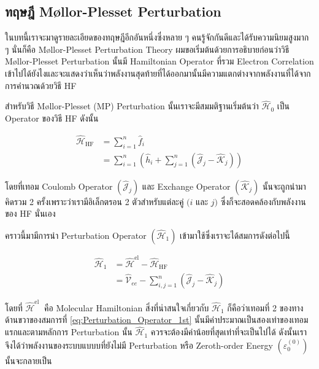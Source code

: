 \subsection{ทฤษฎี M\o{}llor-Plesset Perturbation}

ในบทนี้เราจะมาดูรายละเอียดของทฤษฎีอีกอันหนึ่งซึ่งหลาย ๆ คนรู้จักกันดีและได้รับความนิยมสูงมาก ๆ นั่นก็คือ M\o{}llor-Plesset Perturbation 
Theory ผมขอเริ่มต้นด้วยการอธิบายก่อนว่าวิธี M\o{}llor-Plesset Perturbation นั้นมี Hamiltonian Operator ที่รวม Electron 
Correlation เข้าไปได้ยังไงและจะแสดงว่าเห็นว่าพลังงานสุดท้ายที่ได้ออกมานั้นมีความแตกต่างจากพลังงานที่ได้จากการคำนวณด้วยวิธี HF 

สำหรับวิธี M\o{}llor-Plesset (MP) Perturbation นั้นเราจะมีสมมติฐานเริ่มต้นว่า $\hat{\mathscr{H}}_0$ เป็น Operator ของวิธี HF 
ดังนั้น

\begin{equation}
    \begin{aligned}
        \hat{\mathscr{H}}_{\mathrm{HF}} 
        & = \sum_{i=1}^n \hat{f}_i \\
        & = \sum_{i=1}^n 
            \left(\hat{h}_i+\sum_{j=1}^n\left(\hat{\mathscr{J}}_j-\hat{\mathscr{K}}_j\right)\right)
    \end{aligned}
\end{equation}

\noindent โดยที่เทอม Coulomb Operator $(\hat{\mathcal{J}}_j)$ และ Exchange Operator $(\hat{\mathcal{K}}_j)$  
นั้นจะถูกนำมาคิดรวม 2 ครั้งเพราะว่าเรามีอิเล็กตรอน 2 ตัวสำหรับแต่ละคู่ $(i$ และ $j)$ ซึ่งก็จะสอดคล้องกับพลังงานของ HF นั่นเอง 

คราวนี้มามีการนำ Perturbation Operator $(\hat{\mathscr{H}}_1)$ เข้ามาใช้ซึ่งเราจะได้สมการดังต่อไปนี้ 

\begin{equation}
    \label{eq:Perturbation_Operator_1st}
    \begin{aligned}
        \hat{\mathscr{H}}_1 
        & = \hat{\mathscr{H}}^{\mathrm{el}}-\hat{\mathscr{H}}_{\mathrm{HF}} \\ 
        & = \hat{\mathscr{V}}_{e e} - \sum_{i, j=1}^n\left(\hat{\mathscr{J}}_j - \hat{\mathscr{K}}_j\right)
    \end{aligned}
\end{equation}

\noindent โดยที่ $\hat{\mathscr{H}}^{\text{el }}$ คือ Molecular Hamiltonian สิ่งที่น่าสนใจเกี่ยวกับ $\hat{\mathscr{H}}_1$ 
ก็คือว่าเทอมที่ 2 ของทางด้านขวาของสมการที่ \ref{eq:Perturbation_Operator_1st} นั้นมีค่าประมาณเป็นสองเท่าของเทอมแรกและตามหลักการ 
Perturbation นั้น $\hat{\mathscr{H}}_1$ ควรจะต้องมีค่าน้อยที่สุดเท่าที่จะเป็นไปได้ ดังนั้นเราจึงได้ว่าพลังงานของระบบแบบบที่ยังไม่มี 
Perturbation หรือ Zeroth-order Energy $(\varepsilon_{0}^{(0)})$ นั้นจะกลายเป็น

